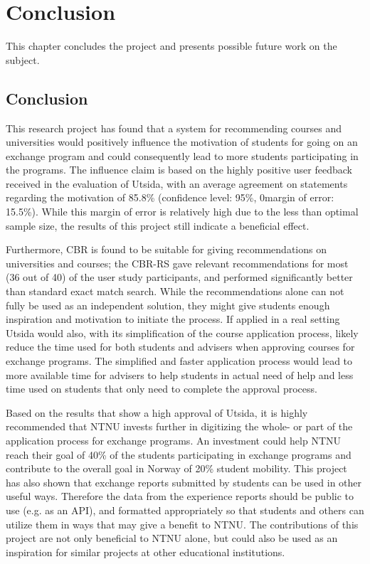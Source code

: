 \chapter{Conclusion}
This chapter concludes the project and presents possible future work on the subject. 

\section{Conclusion}
This research project has found that a system for recommending courses and universities would positively influence the motivation of students for going on an exchange program and could consequently lead to more students participating in the programs. The influence claim is based on the highly positive user feedback received in the evaluation of Utsida, with an average agreement on statements regarding the motivation of 85.8\% (confidence level: 95\%, 0margin of error: 15.5\%). While this margin of error is relatively high due to the less than optimal sample size, the results of this project still indicate a beneficial effect.

Furthermore, CBR is found to be suitable for giving recommendations on universities and courses; the CBR-RS gave relevant recommendations for most (36 out of 40) of the user study participants, and performed significantly better than standard exact match search. While the recommendations alone can not fully be used as an independent solution, they might give students enough inspiration and motivation to initiate the process. If applied in a real setting Utsida would also, with its simplification of the course application process, likely reduce the time used for both students and advisers when approving courses for exchange programs. The simplified and faster application process would lead to more available time for advisers to help students in actual need of help and less time used on students that only need to complete the approval process.

Based on the results that show a high approval of Utsida, it is highly recommended that NTNU invests further in digitizing the whole- or part of the application process for exchange programs. An investment could help NTNU reach their goal of 40\% of the students participating in exchange programs and contribute to the overall goal in Norway of 20\% student mobility. This project has also shown that exchange reports submitted by students can be used in other useful ways. Therefore the data from the experience reports should be public to use (e.g. as an API), and formatted appropriately so that students and others can utilize them in ways that may give a benefit to NTNU. The contributions of this project are not only beneficial to NTNU alone, but could also be used as an inspiration for similar projects at other educational institutions.     


